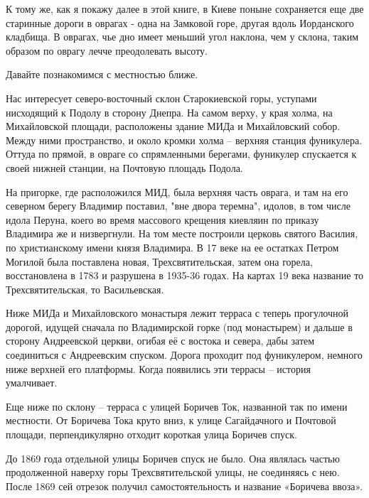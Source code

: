 К тому же, как я покажу далее в этой книге, в Киеве поныне сохраняется еще две старинные дороги в оврагах - одна на Замковой горе, другая вдоль Иорданского кладбища. В оврагах, чье дно имеет меньший угол наклона, чем у склона, таким образом по оврагу лечче преодолевать высоту.

Давайте познакомимся с местностью ближе.

Нас интересует северо-восточный склон Старокиевской горы, уступами нисходящий к Подолу в сторону Днепра. На самом верху, у края холма, на Михайловской площади, расположены здание МИДа и Михайловский собор. Между ними пространство, и около кромки холма – верхняя станция фуникулера. Оттуда по прямой, в овраге со спрямленными берегами, фуникулер спускается к своей нижней станции, на Почтовую площадь Подола.

На пригорке, где расположился МИД, была верхняя часть оврага, и там на его северном берегу Владимир поставил, "вне двора теремна", идолов, в том числе идола Перуна, коего во время массового крещения киевляин по приказу Владимира же и низвергнули. На том месте построили церковь святого Василия, по христианскому имени князя Владимира. В 17 веке на ее остатках Петром Могилой была поставлена новая, Трехсвятительская, затем она горела, восстановлена в 1783 и разрушена в 1935-36 годах. На картах 19 века название то Трехсвятительская, то Васильевская.

Ниже МИДа и Михайловского монастыря лежит терраса с теперь прогулочной дорогой, идущей сначала по Владимирской горке (под монастырем) и дальше в сторону Андреевской церкви, огибая её с востока и севера, дабы затем соединиться с Андреевским спуском. Дорога проходит под фуникулером, немного ниже верхней его платформы. Когда появились эти террасы – история умалчивает.

Еще ниже по склону – терраса с улицей Боричев Ток, названной так по имени местности. От Боричева Тока круто вниз, к улице Сагайдачного и Почтовой площади, перпендикулярно отходит короткая улица Боричев спуск.

До 1869 года отдельной улицы Боричев спуск не было. Она являлась частью продолженной наверху горы Трехсвятительской улицы, не соединяясь с нею. После 1869 сей отрезок получил самостоятельность и название «Боричева ввоза».

